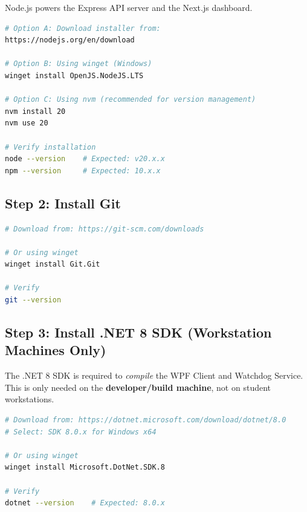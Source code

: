 Node.js powers the Express API server and the Next.js dashboard.

\begin{tcolorbox}[codebox, title={Download \& Install Node.js}]
\begin{lstlisting}[language=bash]
# Option A: Download installer from:
https://nodejs.org/en/download

# Option B: Using winget (Windows)
winget install OpenJS.NodeJS.LTS

# Option C: Using nvm (recommended for version management)
nvm install 20
nvm use 20

# Verify installation
node --version    # Expected: v20.x.x
npm --version     # Expected: 10.x.x
\end{lstlisting}
\end{tcolorbox}

\subsection{Step 2: Install Git}

\begin{tcolorbox}[codebox, title={Install Git}]
\begin{lstlisting}[language=bash]
# Download from: https://git-scm.com/downloads

# Or using winget
winget install Git.Git

# Verify
git --version
\end{lstlisting}
\end{tcolorbox}

\subsection{Step 3: Install .NET 8 SDK (Workstation Machines Only)}

The .NET 8 SDK is required to \emph{compile} the WPF Client and Watchdog Service. This is only needed on the \textbf{developer/build machine}, not on student workstations.

\begin{tcolorbox}[codebox, title={Install .NET 8 SDK}]
\begin{lstlisting}[language=bash]
# Download from: https://dotnet.microsoft.com/download/dotnet/8.0
# Select: SDK 8.0.x for Windows x64

# Or using winget
winget install Microsoft.DotNet.SDK.8

# Verify
dotnet --version    # Expected: 8.0.x
\end{lstlisting}
\end{tcolorbox}

